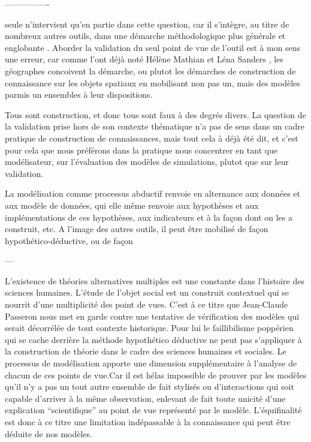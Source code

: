 ----------------

seule n'intervient qu'en partie dans cette question, car il s'intègre, au titre de nombreux autres outils, dans une démarche méthodologique plus générale et englobante \autocite{}. Aborder la validation du seul point de vue de l'outil est à mon sens une erreur, car comme l'ont déjà noté Hélène Mathian et Léna Sanders , les géographes concoivent la démarche, ou plutot les démarches de construction de connaissance sur les objets spatiaux en mobilisant non pas un, mais des modèles parmis un ensembles à leur dispositions. 

Tous sont construction, et donc tous sont faux à des degrés divers. La question de la validation prise hors de son contexte thématique n'a pas de sens dans un cadre pratique de construction de connaissances, mais tout cela à déjà été dit, et c'est pour cela que nous préférons dans la pratique nous concentrer en tant que modélisateur, sur l'évaluation des modèles de simulations, plutot que sur leur validation. \autocite{Amblard2006}


La modélisation comme processus abductif renvoie en alternance aux données et aux modèle de données, qui elle même renvoie aux hypothèses et aux implémentations de ces hypothèses, aux indicateurs et à la façon dont on les a construit, etc. A l'image des autres outils, il peut être mobilisé de façon hypothético-déductive, ou de façon 

---










L’existence de théories alternatives multiples est une constante dans l’histoire des sciences humaines. L'étude de l'objet social est un construit contextuel qui se nourrit d'une multiplicité des point de vues. C'est à ce titre que Jean-Claude Passeron \autocite{Passeron2006} nous met en garde contre une tentative de vérification des modèles qui serait décorrélée de tout contexte historique. Pour lui le faillibilisme poppérien qui se cache derrière la méthode hypothético déductive ne peut pas s'appliquer à la construction de théorie dans le cadre des sciences humaines et sociales. 
Le processus de modélisation apporte une dimension supplémentaire à l'analyse de chacun de ces points de vue.Car il est hélas impossible de prouver par les modèles qu'il n'y a pas un tout autre ensemble de fait stylisés ou d'interactions qui soit capable d'arriver à la même observation, enlevant de fait toute unicité d’une explication \enquote{scientifique} au point de vue représenté par le modèle. L'équifinalité est donc à ce titre une limitation indépassable à la connaissance qui peut être déduite de nos modèles.

